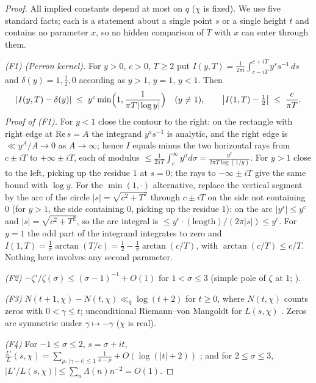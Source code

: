 \documentclass[11pt]{article}
\begin{document}
\begin{proof}
All implied constants depend at most on $q$ ($\chi$ is fixed). We use
five
standard facts; each is a statement about a single point $s$ or a single
height $t$ and contains no parameter $x$, so no hidden comparison of $T$
with $x$ can enter through them.

\emph{(F1) (Perron kernel).} For $y>0$, $c>0$, $T\ge2$ put
$I(y,T)=\frac{1}{2\pi i}\int_{c-iT}^{c+iT}y^s s^{-1}\,ds$ and
$\delta(y)=1,\tfrac12,0$ according as $y>1$, $y=1$, $y<1$. Then
\[
|I(y,T)-\delta(y)|\;\le\;y^{c}\min\Bigl(1,\frac{1}{\pi T|\log y|}\Bigr)
\quad(y\ne1),\qquad
\bigl|I(1,T)-\tfrac12\bigr|\;\le\;\frac{c}{\pi T}.
\]
\emph{Proof of (F1).} For $y<1$ close the contour to the right: on the
rectangle with right edge at $\mathrm{Re}\,s=A$ the integrand
$y^ss^{-1}$ is analytic, and the right edge is $\ll y^A/A\to0$ as
$A\to\infty$; hence $I$ equals minus the two horizontal rays from
$c\pm iT$ to $+\infty\pm iT$, each of modulus
$\le\frac{1}{2\pi T}\int_c^\infty y^\sigma d\sigma
=\frac{y^c}{2\pi T\log(1/y)}$. For $y>1$ close to the left, picking up
the residue $1$ at $s=0$; the rays to $-\infty\pm iT$ give the same
bound with $\log y$. For the $\min(1,\cdot)$ alternative, replace the
vertical segment by the arc of the circle $|s|=\sqrt{c^2+T^2}$ through
$c\pm iT$ on the side not containing $0$ (for $y>1$, the side
containing $0$, picking up the residue $1$): on the arc
$|y^s|\le y^{c}$ and $|s|=\sqrt{c^2+T^2}$, so the arc integral is
$\le y^c\cdot(\text{length})/(2\pi|s|)\le y^{c}$. For $y=1$ the odd
part of the integrand integrates to zero and
$I(1,T)=\frac1\pi\arctan(T/c)=\tfrac12-\frac1\pi\arctan(c/T)$, with
$\arctan(c/T)\le c/T$. Nothing here involves any second parameter.

\emph{(F2)} $-\zeta'/\zeta(\sigma)\le(\sigma-1)^{-1}+O(1)$ for
$1<\sigma\le3$ (simple pole of $\zeta$ at $1$; \cite[\S17]{Dav00}).

\emph{(F3)} $N(t+1,\chi)-N(t,\chi)\ll_q\log(t+2)$ for $t\ge0$, where
$N(t,\chi)$ counts zeros with $0<\gamma\le t$; unconditional
Riemann--von Mangoldt for $L(s,\chi)$ \cite[\S16]{Dav00}. Zeros are
symmetric under $\gamma\mapsto-\gamma$ ($\chi$ is real).

\emph{(F4)} For $-1\le\sigma\le2$, $s=\sigma+it$,
$\frac{L'}{L}(s,\chi)=\sum_{\rho:\,|\gamma-t|\le1}\frac{1}{s-\rho}
+O(\log(|t|+2))$ \cite[\S16]{Dav00}; and for $2\le\sigma\le3$,
$|L'/L(s,\chi)|\le\sum_n\Lambda(n)n^{-2}=O(1)$.


\end{proof}
\end{document}
